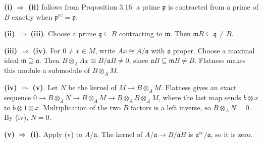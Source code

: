 \textbf{(i)} $\Rightarrow$ \textbf{(ii)} follows from Proposition 3.16: a prime $\mathfrak p$ is contracted from a prime of $B$ exactly when $\mathfrak p^{ec}=\mathfrak p$.

\textbf{(ii)} $\Rightarrow$ \textbf{(iii)}. Choose a prime $\mathfrak q\subseteq B$ contracting to $\mathfrak m$. Then $\mathfrak mB\subseteq\mathfrak q\ne B$.

\textbf{(iii)} $\Rightarrow$ \textbf{(iv)}. For $0\ne x\in M$, write $Ax\cong A/\mathfrak a$ with $\mathfrak a$ proper. Choose a maximal ideal $\mathfrak m\supseteq\mathfrak a$. Then $B\otimes_A Ax\cong B/\mathfrak aB\ne0$, since $\mathfrak aB\subseteq\mathfrak mB\ne B$. Flatness makes this module a submodule of $B\otimes_A M$.

\textbf{(iv)} $\Rightarrow$ \textbf{(v)}. Let $N$ be the kernel of $M\to B\otimes_A M$. Flatness gives an exact sequence $0\to B\otimes_A N\to B\otimes_A M\to B\otimes_A B\otimes_A M$, where the last map sends $b\otimes x$ to $b\otimes1\otimes x$. Multiplication of the two $B$ factors is a left inverse, so $B\otimes_A N=0$. By (iv), $N=0$.

\textbf{(v)} $\Rightarrow$ \textbf{(i)}. Apply (v) to $A/\mathfrak a$. The kernel of $A/\mathfrak a\to B/\mathfrak aB$ is $\mathfrak a^{ec}/\mathfrak a$, so it is zero.
